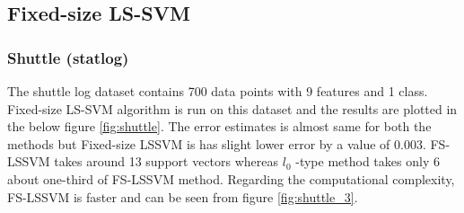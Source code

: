 \subsection{ Fixed-size LS-SVM}
\subsubsection{ Shuttle (statlog)}
The shuttle log dataset contains 700 data points with 9 features and 1 class. Fixed-size LS-SVM algorithm is run on this dataset and the results are plotted in the below figure \ref{fig:shuttle}. The error estimates is almost same for both the methods but Fixed-size LSSVM is has slight lower error by a value of 0.003. FS-LSSVM takes around 13 support vectors whereas $l_0$ -type method takes only 6 about one-third of FS-LSSVM method. Regarding the computational complexity, FS-LSSVM is faster and can be seen from figure \ref{fig:shuttle_3}. 
